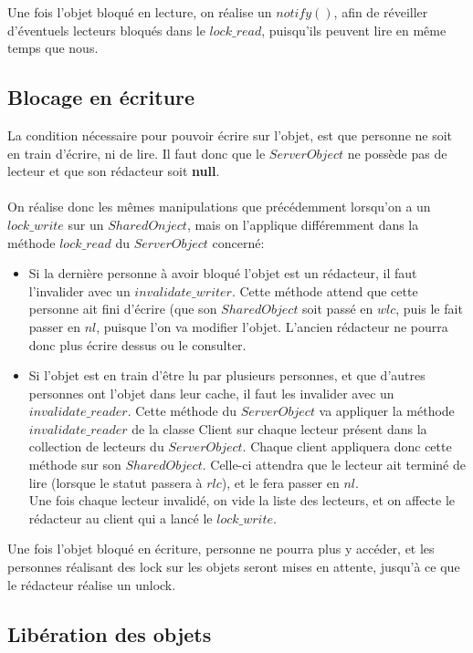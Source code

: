 \documentclass[11pt,a4paper]{report}
\begin{document}
Une fois l'objet bloqué en lecture, on réalise un $notify()$, afin de réveiller d'éventuels lecteurs bloqués dans le $lock\_read$, puisqu'ils peuvent lire en même temps que nous. 

\newpage
\subsection{Blocage en écriture}

La condition nécessaire pour pouvoir écrire sur l'objet, est que personne ne soit en train d'écrire, ni de lire. Il faut donc que le $ServerObject$ ne possède pas de lecteur et que son rédacteur soit \textbf{null}.\\\\
On réalise donc les mêmes manipulations que précédemment lorsqu'on a un $lock\_write$ sur un $SharedOnject$, mais on l'applique différemment dans la méthode $lock\_read$ du $ServerObject$ concerné: 
\begin{itemize}
\item Si la dernière personne à avoir bloqué l'objet est un rédacteur, il faut l'invalider avec un $invalidate\_writer$. Cette méthode attend que cette personne ait fini d'écrire (que son $SharedObject$ soit passé en $wlc$, puis le fait passer en $nl$, puisque l'on va modifier l'objet. L'ancien rédacteur ne pourra donc plus écrire dessus ou le consulter.
\item Si l'objet est en train d'être lu par plusieurs personnes, et que d'autres personnes ont l'objet dans leur cache, il faut les invalider avec un $invalidate\_reader$. Cette méthode du $ServerObject$ va appliquer la méthode $invalidate\_reader$ de la classe Client sur chaque lecteur présent dans la collection de lecteurs du $ServerObject$. Chaque client appliquera donc cette méthode sur son $SharedObject$. Celle-ci attendra que le lecteur ait terminé de lire (lorsque le statut passera à $rlc$), et le fera passer en $nl$.\\
Une fois chaque lecteur invalidé, on vide la liste des lecteurs, et on affecte le rédacteur au client qui a lancé le $lock\_write$.
\end{itemize}

Une fois l'objet bloqué en écriture, personne ne pourra plus y accéder, et les personnes réalisant des lock sur les objets seront mises en attente, jusqu'à ce que le rédacteur réalise un unlock.
\newpage
\subsection{Libération des objets}
\end{document}
